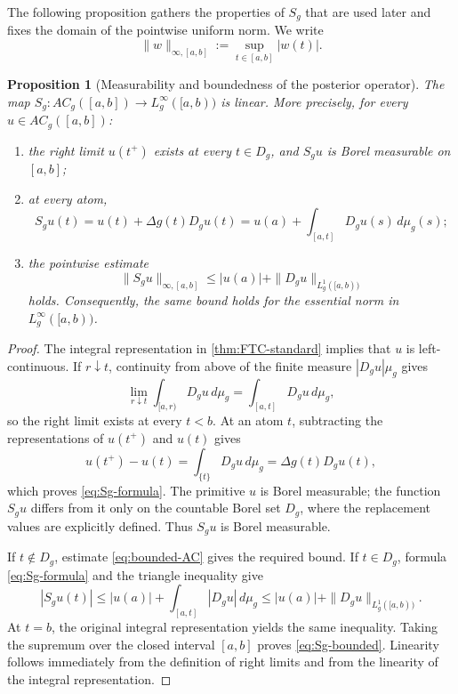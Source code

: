 \documentclass[preprint,12pt]{elsarticle}
\newenvironment{revision}{\begingroup\color{red}}{\endgroup}
\newenvironment{revision}{}{}
\newtheorem{proposition}[theorem]{Proposition}
\theoremstyle{definition}
\theoremstyle{remark}
\begin{document}
\begin{revision}
The following proposition gathers the properties of \(S_g\) that are used later
and fixes the domain of the pointwise uniform norm.  We write
\[
 \|w\|_{\infty,[a,b]}:=\sup_{t\in[a,b]}|w(t)|.
\]

\begin{proposition}[Measurability and boundedness of the posterior operator]
\label{prop:Sg-properties}
The map \(S_g:AC_g([a,b])\to L_g^\infty([a,b))\) is linear.  More
precisely, for every \(u\in AC_g([a,b])\):
\begin{enumerate}[label=\roman*)]
 \item the right limit \(u(t^+)\) exists at every \(t\in D_g\), and
       \(S_gu\) is Borel measurable on \([a,b]\);
 \item at every atom,
 \begin{equation}\label{eq:Sg-formula}
  S_gu(t)=u(t)+\Delta g(t)D_gu(t)
          =u(a)+\int_{[a,t]}D_gu(s)\,d\mu_g(s);
 \end{equation}
 \item the pointwise estimate
 \begin{equation}\label{eq:Sg-bounded}
  \|S_gu\|_{\infty,[a,b]}
  \le |u(a)|+\|D_gu\|_{L_g^1([a,b))}
 \end{equation}
 holds.  Consequently, the same bound holds for the essential norm in
 \(L_g^\infty([a,b))\).
\end{enumerate}
\end{proposition}

\begin{proof}
The integral representation in \cref{thm:FTC-standard} implies that \(u\) is
left-continuous.  If \(r\downarrow t\), continuity from above of the finite
measure \(|D_gu|\mu_g\) gives
\[
 \lim_{r\downarrow t}\int_{[a,r)}D_gu\,d\mu_g
 =\int_{[a,t]}D_gu\,d\mu_g,
\]
so the right limit exists at every \(t<b\).  At an atom \(t\), subtracting
the representations of \(u(t^+)\) and \(u(t)\) gives
\[
 u(t^+)-u(t)=\int_{\{t\}}D_gu\,d\mu_g
             =\Delta g(t)D_gu(t),
\]
which proves \eqref{eq:Sg-formula}.  The primitive \(u\) is Borel measurable;
the function \(S_gu\) differs from it only on the countable Borel set \(D_g\),
where the replacement values are explicitly defined.  Thus \(S_gu\) is Borel
measurable.

If \(t\notin D_g\), estimate \eqref{eq:bounded-AC} gives the required bound.
If \(t\in D_g\), formula \eqref{eq:Sg-formula} and the triangle inequality give
\[
 |S_gu(t)|
 \le |u(a)|+\int_{[a,t]}|D_gu|\,d\mu_g
 \le |u(a)|+\|D_gu\|_{L_g^1([a,b))}.
\]
At \(t=b\), the original integral representation yields the same inequality.
Taking the supremum over the closed interval \([a,b]\) proves
\eqref{eq:Sg-bounded}.  Linearity follows immediately from the definition of
right limits and from the linearity of the integral representation.
\end{proof}
\end{revision}
\end{document}
